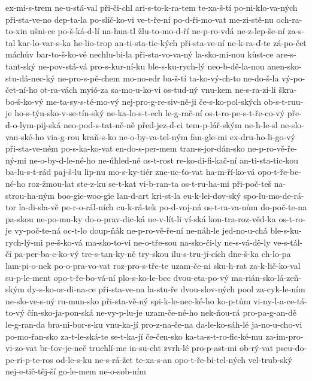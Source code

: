 ex-mi-s-trem
ne-u-stá-val
při-či-chl
ari-s-to-k-ra-tem
te-xa-š-tí
po-ni-klo-va-ných
při-sta-ve-no
dep-ta-la
po-slíč-ko-vi
ve-t-ře-ní
po-d-ři-mo-vat
me-zi-stě-nu
och-ra-to-xin
ušni-ce
po-š-ká-d-lí
na-hua-tl
žlu-to-mo-d-ří
ne-p-ro-vdá
ne-z-lep-še-ní
za-s-tal
kar-lo-var-s-ka
he-lio-trop
an-ti-sta-tic-kých
při-sta-ve-ní
ne-k-ra-ď-te
zá-po-čet
máchův
bar-to-š-ko-vé
nechlu-bi-la
při-sta-vo-va-ný
la-sko-mi-nou
kůst-ce
are-s-tant-ský
ne-pov-stá-vá
pro-s-kur-ní-ku
ble-s-ku-rych-lý
neo-b-dě-la-nou
anen-sko-stu-dá-nec-ký
ne-pro-s-pě-chem
mo-no-edr
ba-š-tí
ta-ko-vý-ch-to
ne-do-š-la
vý-po-čet-ní-ho
ot-ra-vách
myió-za
sa-mo-u-ko-vi
os-tud-ný
vnu-kem
ne-s-ra-zi-li
škra-bo-š-ko-vý
me-ta-sy-s-té-mo-vý
nej-pro-g-re-siv-ně-ji
če-s-ko-pol-ských
ob-s-t-ruu-je
ho-s-týn-sko-v-se-tín-ský
ne-ka-lo-s-t-ech
le-g-rač-ní
os-t-ro-pe-s-t-ře-co-vý
pře-d-o-lym-pij-ská
neo-pod-s-tat-ně-ně
před-jez-d-ci
tem-p-lář-ským
ne-h-le-sl
ne-slo-van-ské-ho
via-g-rou
kraň-s-ko
ne-o-by-va-tel-ným
fan-gle-mi
ex-dru-ho-li-go-vý
při-sta-ve-ném
po-s-ka-ko-vat
en-do-s-per-mem
tran-s-jor-dán-sko
ne-p-ro-vě-ře-ný-mi
ne-o-by-d-le-né-ho
ne-úhled-né
os-t-rost
re-ko-di-fi-kač-ní
an-ti-sta-tic-kou
ba-lu-s-t-rád
paj-š-lu
lip-nu
mo-s-ky-tiér
zne-uc-ťo-vat
ha-m-ří-ko-vá
opo-t-ře-be-né-ho
roz-žmou-lat
ste-z-ku
se-t-kat
vi-b-ran-ta
os-t-ru-ha-mi
při-poč-teš
na-strou-ha-ným
boo-gie-woo-gie
lan-d-art
kri-st-la
eu-k-lei-dov-ský
spo-lu-mo-de-rá-tor
la-di-sla-vě
pe-r-o-rál-ních
cu-k-rá-tek
po-d-voj-ná
os-t-ra-va-nům
do-poč-te-na
pa-skou
ne-po-mu-ky
do-o-prav-dic-ká
ne-v-lít-li
ví-ská
kon-tra-roz-věd-ka
os-t-ro-je
vy-poč-te-ná
oc-t-lo
doup-ňák
ne-p-ro-vě-ře-ní
ne-náh-le
jed-no-u-chá
ble-s-ku-rych-lý-mi
pe-š-ko-vá
ma-sko-to-vi
ne-o-tře-sou
na-sko-či-ly
ne-s-vá-dě-ly
ve-s-tál-čí
pa-per-ba-c-ko-vý
tre-s-tan-ky-ně
try-skou
ilu-s-tru-jí-cích
dne-š-ka
ch-lo-pa
lam-pi-o-nek
po-o-pra-vo-vat
roz-pro-s-tře-te
uzam-če-ni
sku-h-rat
za-k-lič-ko-val
su-p-le-ment
opo-t-ře-bo-vá-ní
plo-s-ko-le-bec
dvou-eta-po-vý
ma-rián-sko-lá-zeň-ským
dy-s-ko-or-di-na-ce
při-sta-ve-na
la-stu-ře
dvou-slov-ných
pool
za-cyk-le-ním
ne-slo-ve-s-ný
ru-mun-sko
při-sta-vě-ný
spi-k-le-nec-ké-ho
ko-p-tům
vi-ny-l-a-ce-tá-to-vý
čín-sko-ja-pon-ská
ne-vy-p-lu-je
uzam-če-né-ho
nek-ňou-rá
pro-pa-g-an-dě
le-g-ran-da
bra-ni-bor-s-ku
vnu-ka-jí
pro-z-na-če-na
da-le-ko-sáh-lé
ja-no-u-cho-vi
po-mo-řan-sko
za-t-le-ská-te
se-t-ka-jí
če-čen-sko
ka-ta-s-t-ro-fic-ké-mu
za-im-pro-vi-zo-vat
br-ťov-je-neč
truchlí-me
in-su-cht
zvrh-lé
pro-p-ast-mi
ob-rý-vat
pseu-do-pe-ri-p-te-ros
od-le-s-ku
ne-s-rá-žet
te-xa-s-an
opo-t-ře-bi-tel-ných
vel-trub-ský
nej-e-tič-těj-ší
go-le-mem
ne-o-sob-ním
